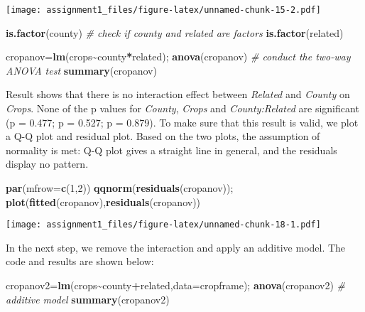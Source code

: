 \documentclass[
]{article}
\newenvironment{Shaded}{\begin{snugshade}}{\end{snugshade}}
\newcommand{\AttributeTok}[1]{\textcolor[rgb]{0.13,0.29,0.53}{#1}}
\newcommand{\CommentTok}[1]{\textcolor[rgb]{0.56,0.35,0.01}{\textit{#1}}}
\newcommand{\DecValTok}[1]{\textcolor[rgb]{0.00,0.00,0.81}{#1}}
\newcommand{\FunctionTok}[1]{\textcolor[rgb]{0.13,0.29,0.53}{\textbf{#1}}}
\newcommand{\NormalTok}[1]{#1}
\newcommand{\OtherTok}[1]{\textcolor[rgb]{0.56,0.35,0.01}{#1}}
\newcommand{\SpecialCharTok}[1]{\textcolor[rgb]{0.81,0.36,0.00}{\textbf{#1}}}
\begin{document}
\texttt{[image: assignment1\_files/figure-latex/unnamed-chunk-15-2.pdf]}

\begin{Shaded}
\begin{Highlighting}[]
\FunctionTok{is.factor}\NormalTok{(county) }\CommentTok{\# check if county and related are factors}
\FunctionTok{is.factor}\NormalTok{(related)}
\end{Highlighting}
\end{Shaded}

\begin{Shaded}
\begin{Highlighting}[]
\NormalTok{cropanov}\OtherTok{=}\FunctionTok{lm}\NormalTok{(crops}\SpecialCharTok{\textasciitilde{}}\NormalTok{county}\SpecialCharTok{*}\NormalTok{related); }\FunctionTok{anova}\NormalTok{(cropanov) }\CommentTok{\# conduct the two{-}way ANOVA test}
\FunctionTok{summary}\NormalTok{(cropanov)}
\end{Highlighting}
\end{Shaded}

Result shows that there is no interaction effect between \emph{Related}
and \emph{County} on \emph{Crops}. None of the p values for
\emph{County}, \emph{Crops} and \emph{County:Related} are significant (p
= 0.477; p = 0.527; p = 0.879). To make sure that this result is valid,
we plot a Q-Q plot and residual plot. Based on the two plots, the
assumption of normality is met: Q-Q plot gives a straight line in
general, and the residuals display no pattern.

\begin{Shaded}
\begin{Highlighting}[]
\FunctionTok{par}\NormalTok{(}\AttributeTok{mfrow=}\FunctionTok{c}\NormalTok{(}\DecValTok{1}\NormalTok{,}\DecValTok{2}\NormalTok{))}
\FunctionTok{qqnorm}\NormalTok{(}\FunctionTok{residuals}\NormalTok{(cropanov)); }\FunctionTok{plot}\NormalTok{(}\FunctionTok{fitted}\NormalTok{(cropanov),}\FunctionTok{residuals}\NormalTok{(cropanov))}
\end{Highlighting}
\end{Shaded}

\texttt{[image: assignment1\_files/figure-latex/unnamed-chunk-18-1.pdf]}

In the next step, we remove the interaction and apply an additive model.
The code and results are shown below:

\begin{Shaded}
\begin{Highlighting}[]
\NormalTok{cropanov2}\OtherTok{=}\FunctionTok{lm}\NormalTok{(crops}\SpecialCharTok{\textasciitilde{}}\NormalTok{county}\SpecialCharTok{+}\NormalTok{related,}\AttributeTok{data=}\NormalTok{cropframe); }\FunctionTok{anova}\NormalTok{(cropanov2) }\CommentTok{\# additive model}
\FunctionTok{summary}\NormalTok{(cropanov2)}
\end{Highlighting}
\end{Shaded}
\end{document}
